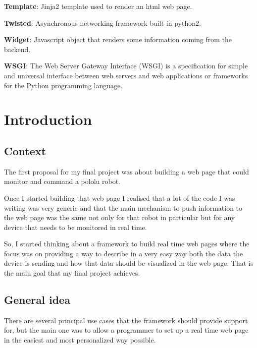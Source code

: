 \documentclass[12pt]{article}
\begin{document}
            \textbf{Template}: Jinja2 template used to render an html
                web page.

            \textbf{Twisted}: Asynchronous networking framework built
                in python2.

            \textbf{Widget}: Javascript object that renders some
                information coming from the backend.

            \textbf{WSGI}: The Web Server Gateway Interface (WSGI) is a
                specification for simple and universal interface between web
                servers and web applications or frameworks for the Python
                programming language.

            \setlength{\parindent}{1cm}

        \newpage
        \section{Introduction}
        \subsection{Context}
            The first proposal for my final project was about building a web
            page that could monitor and command a pololu robot.

            Once I started building that web page I realised that a lot of the
            code I was writing was very generic and that the main mechanism to
            push information to the web page was the same not only for that
            robot in particular but for any device that needs to be monitored in
            real time.

            So, I started thinking about a framework to build real time web
            pages where the focus was on providing a way to describe in a very
            easy way both the data the device is sending and how that data
            should be visualized in the web page. That is the main goal that my
            final project achieves.

        \subsection{General idea}
            There are several principal use cases that the framework should
            provide support for, but the main one was to allow a programmer to
            set up a real time web page in the easiest and most personalized
            way possible.
\end{document}
